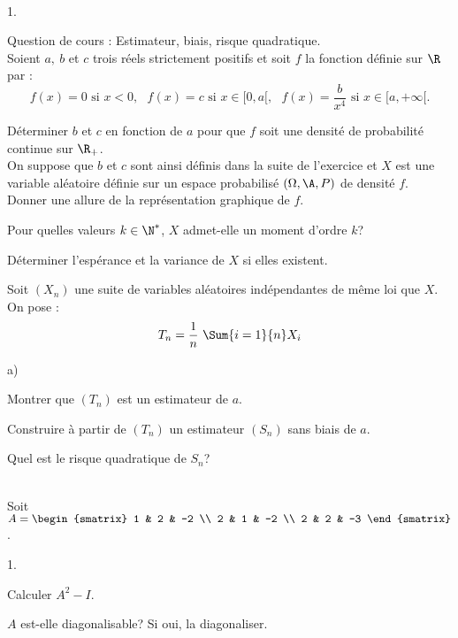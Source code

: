 \documentclass[11pt]{article}%
\begin{document}
\begin{exerciceAP}~
  \begin{noliste}{1.}
    \setlength{\itemsep}{2mm}
  \item Question de cours : Estimateur, biais, risque quadratique. \\[.2cm]
    Soient $a,\ b$ et $c$ trois réels strictement positifs et soit $f$
    la fonction définie sur $\R$ par :
    \[
    f(x) = 0 \text{ si } x < 0,\ \ \ f(x) = c \text{ si } x \in [ 0 ,
    a[,\ \ \ f(x) = \frac{b}{x^4} \text{ si } x \in [ a , +\infty[.
    \]
  \item Déterminer $b$ et $c$ en fonction de $a$ pour que $f$ soit une
    densité de probabilité continue sur $\R_+$.\\
    On suppose que $b$ et $c$ sont ainsi définis dans la suite de
    l'exercice et $X$ est une variable aléatoire définie sur un espace
    probabilisé $(\Omega , \A , P)$ de densité $f$. \\ 
    Donner une allure de la représentation graphique de $f$.
  \item Pour quelles valeurs $k \in \N^*$, $X$ admet-elle un moment d'ordre $k$?
  \item Déterminer l'espérance et la variance de $X$ si elles existent.
  \item Soit $(X_n)$ une suite de variables aléatoires indépendantes
    de même loi que $X$. On pose :
    \[ 
    T_n = \dfrac{1}{n} \ \Sum{i=1}{n} X_i
    \]
    \begin{noliste}{a)}
    \setlength{\itemsep}{2mm} 
    \item Montrer que $(T_n)$ est un estimateur de $a$.
    \item Construire à partir de $(T_n)$ un estimateur $(S_n)$ sans
      biais de $a$.
    \item Quel est le risque quadratique de $S_n$?
    \end{noliste}
  \end{noliste}
\end{exerciceAP}


\begin{exerciceSP}~\\
  Soit $A = 
  \begin{smatrix} 
    1 & 2 & -2 \\ 
    2 & 1 & -2 \\ 
    2 & 2 & -3
  \end{smatrix}$.
  \begin{noliste}{1.}
    \setlength{\itemsep}{2mm}
  \item Calculer $A^2 - I$.
  \item $A$ est-elle diagonalisable? Si oui, la diagonaliser.

  \end{noliste}
\end{exerciceSP}

\end{document}

